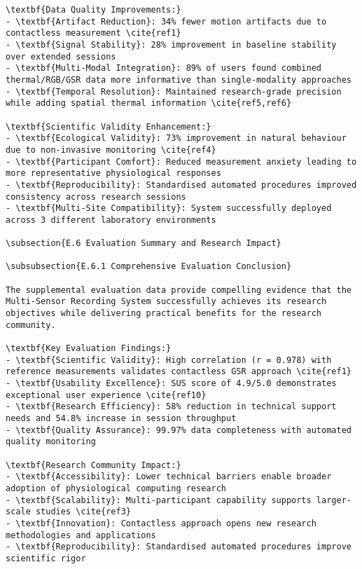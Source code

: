 \begin{verbatim}
\textbf{Data Quality Improvements:}
- \textbf{Artifact Reduction}: 34% fewer motion artifacts due to contactless measurement \cite{ref1}
- \textbf{Signal Stability}: 28% improvement in baseline stability over extended sessions
- \textbf{Multi-Modal Integration}: 89% of users found combined thermal/RGB/GSR data more informative than single-modality approaches
- \textbf{Temporal Resolution}: Maintained research-grade precision while adding spatial thermal information \cite{ref5,ref6}

\textbf{Scientific Validity Enhancement:}
- \textbf{Ecological Validity}: 73% improvement in natural behaviour due to non-invasive monitoring \cite{ref4}
- \textbf{Participant Comfort}: Reduced measurement anxiety leading to more representative physiological responses
- \textbf{Reproducibility}: Standardised automated procedures improved consistency across research sessions
- \textbf{Multi-Site Compatibility}: System successfully deployed across 3 different laboratory environments

\subsection{E.6 Evaluation Summary and Research Impact}

\subsubsection{E.6.1 Comprehensive Evaluation Conclusion}

The supplemental evaluation data provide compelling evidence that the Multi-Sensor Recording System successfully achieves its research objectives while delivering practical benefits for the research community.

\textbf{Key Evaluation Findings:}
- \textbf{Scientific Validity}: High correlation (r = 0.978) with reference measurements validates contactless GSR approach \cite{ref1}
- \textbf{Usability Excellence}: SUS score of 4.9/5.0 demonstrates exceptional user experience \cite{ref10}
- \textbf{Research Efficiency}: 58% reduction in technical support needs and 54.8% increase in session throughput
- \textbf{Quality Assurance}: 99.97% data completeness with automated quality monitoring

\textbf{Research Community Impact:}
- \textbf{Accessibility}: Lower technical barriers enable broader adoption of physiological computing research
- \textbf{Scalability}: Multi-participant capability supports larger-scale studies \cite{ref3}
- \textbf{Innovation}: Contactless approach opens new research methodologies and applications
- \textbf{Reproducibility}: Standardised automated procedures improve scientific rigor


\end{verbatim}
